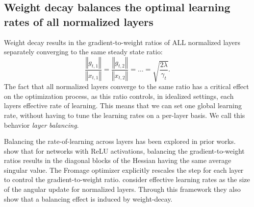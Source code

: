 \documentclass[]{fairmeta}
\begin{document}
\subsection{Weight decay balances the optimal learning rates of all normalized layers}

Weight decay results in the gradient-to-weight ratios of ALL normalized layers separately converging to the same steady state ratio:
\[
\frac{\left\Vert g_{t,1}\right\Vert }{\left\Vert x_{t,1}\right\Vert }=\frac{\left\Vert g_{t,2}\right\Vert }{\left\Vert x_{t,2}\right\Vert }=\dots=\sqrt{\frac{2\lambda}{\gamma_t}}.
\]
The fact that all normalized layers converge to the same ratio has a critical effect on the optimization process, as this ratio controls, in idealized settings, each layers effective rate of learning.  This means that we can set one global learning rate, without having to tune the learning rates on a per-layer basis. We call this behavior \emph{layer balancing}. 

Balancing the rate-of-learning across layers has been explored in prior works.  \citet{defazioscaling2022} show that for networks with ReLU activations, balancing the gradient-to-weight ratios results in the diagonal blocks of the Hessian having the same average singular value. The Fromage optimizer \citep{bernstein2020distance} explicitly rescales the step for each layer to control the gradient-to-weight ratio. \citet{kosson2024rotationalequilibriumweightdecay} consider effective learning rates as the size of the angular update for normalized layers. Through this framework they also show that a balancing effect is induced by weight-decay.

\end{document}
